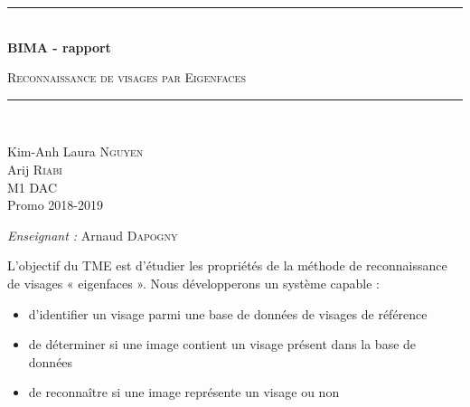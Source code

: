 \documentclass[a4paper]{article}
\newcommand{\HRule}{\rule{\linewidth}{0.5mm}}
\begin{document}
\begin{titlepage}
  \begin{center}


      \vspace{4cm}
    \HRule \\[0.4cm]
    { \huge \bfseries BIMA - rapport \\[0.4cm] }

      \textsc{\LARGE Reconnaissance de visages par Eigenfaces}\\[0.4cm]

    \HRule \\[0.8cm]

    \begin{minipage}{0.4\textwidth}
      \begin{flushleft} \large
        Kim-Anh Laura \textsc{Nguyen}\\
        \large
        Arij \textsc{Riabi}\\
        M1 DAC\\
        Promo 2018-2019 \\
      \end{flushleft}
    \end{minipage}
    \begin{minipage}{0.5\textwidth}
      \begin{flushright} \large
        \emph{Enseignant :} Arnaud \textsc{Dapogny}\\
      \end{flushright}
    \end{minipage}

      \vspace{2cm}

  \end{center}
\end{titlepage}

\newpage

L’objectif du TME est d’étudier les propriétés de la méthode de reconnaissance
de visages « eigenfaces ».
Nous développerons un système capable :
\begin{itemize}
    \item d’identifier un visage parmi une base de données de visages de référence
    \item de déterminer si une image contient un visage présent dans la base de données
    \item de reconnaître si une image représente un visage ou non \\
\end{itemize}
\end{document}
